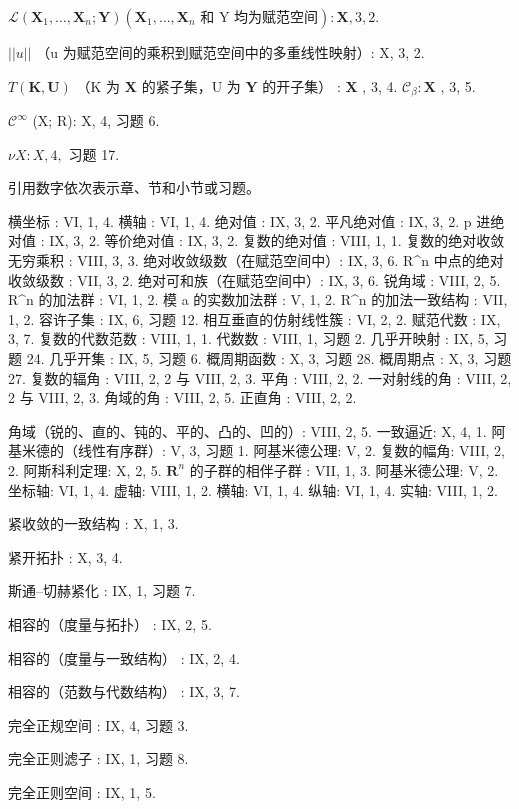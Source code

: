 \(\mathscr{L}\left(\mathbf{X}_{1},\ldots,\mathbf{X}_{n};\mathbf{Y}\right)\left(\mathbf{X}_{1},\ldots,\mathbf{X}_{n}\text{ 和 Y 均为赋范空间}\right):\mathbf{X},3,2.\)

\(||u||\) （u 为赋范空间的乘积到赋范空间中的多重线性映射）: X, 3, 2.

\(T(\mathbf{K},\mathbf{U})\) （K 为 \(\mathbf{X}\) 的紧子集，U 为 \(\mathbf{Y}\) 的开子集） : \(\mathbf{X}\) , 3, 4. \(\mathcal{C}_{\beta}:\mathbf{X}\) , 3, 5.

\(\mathcal{C}^{\infty}\) (X; R): X, 4, 习题 6.

\(\nu X:X,4,\) 习题 17.

引用数字依次表示章、节和小节或习题。

横坐标 : VI, 1, 4. 横轴 : VI, 1, 4. 绝对值 : IX, 3, 2. 平凡绝对值 : IX, 3, 2. p 进绝对值 : IX, 3, 2. 等价绝对值 : IX, 3, 2. 复数的绝对值 : VIII, 1, 1. 复数的绝对收敛无穷乘积 : VIII, 3, 3. 绝对收敛级数（在赋范空间中）: IX, 3, 6. R\^{}n 中点的绝对收敛级数 : VII, 3, 2. 绝对可和族（在赋范空间中）: IX, 3, 6. 锐角域 : VIII, 2, 5. R\^{}n 的加法群 : VI, 1, 2. 模 a 的实数加法群 : V, 1, 2. R\^{}n 的加法一致结构 : VII, 1, 2. 容许子集 : IX, 6, 习题 12. 相互垂直的仿射线性簇 : VI, 2, 2. 赋范代数 : IX, 3, 7. 复数的代数范数 : VIII, 1, 1. 代数数 : VIII, 1, 习题 2. 几乎开映射 : IX, 5, 习题 24. 几乎开集 : IX, 5, 习题 6. 概周期函数 : X, 3, 习题 28. 概周期点 : X, 3, 习题 27. 复数的辐角 : VIII, 2, 2 与 VIII, 2, 3. 平角 : VIII, 2, 2. 一对射线的角 : VIII, 2, 2 与 VIII, 2, 3. 角域的角 : VIII, 2, 5. 正直角 : VIII, 2, 2.

角域（锐的、直的、钝的、平的、凸的、凹的）: VIII, 2, 5. 一致逼近: X, 4, 1. 阿基米德的（线性有序群）: V, 3, 习题 1. 阿基米德公理: V, 2. 复数的幅角: VIII, 2, 2. 阿斯科利定理: X, 2, 5. \(\mathbf{R}^n\) 的子群的相伴子群 : VII, 1, 3. 阿基米德公理: V, 2. 坐标轴: VI, 1, 4. 虚轴: VIII, 1, 2. 横轴: VI, 1, 4. 纵轴: VI, 1, 4. 实轴: VIII, 1, 2.

紧收敛的一致结构 : X, 1, 3.

紧开拓扑 : X, 3, 4.

斯通–切赫紧化 : IX, 1, 习题 7.

相容的（度量与拓扑） : IX, 2, 5.

相容的（度量与一致结构） : IX, 2, 4.

相容的（范数与代数结构） : IX, 3, 7.

完全正规空间 : IX, 4, 习题 3.

完全正则滤子 : IX, 1, 习题 8.

完全正则空间 : IX, 1, 5.

